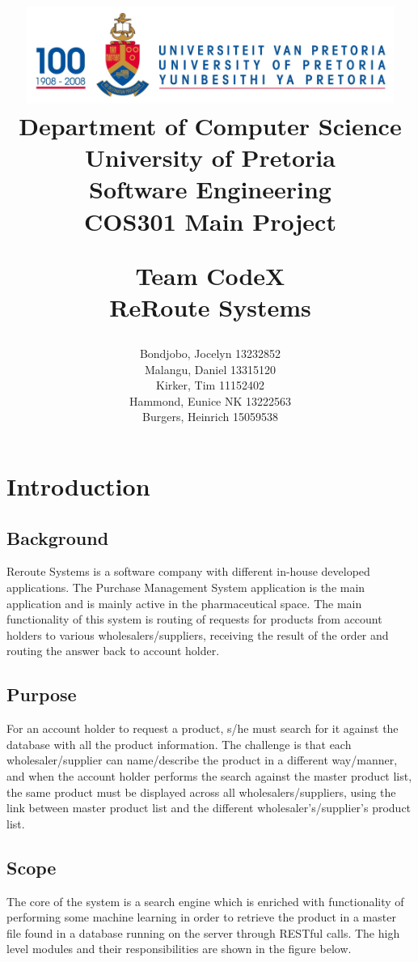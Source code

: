 \documentclass[a4paper,10pt]{article}
\title{\includegraphics[width=12cm]{Eeufeeslogo.jpg} \\
       Department of Computer Science \\
       University of Pretoria \\
       \vspace{0.5cm}
       Software Engineering\\
       COS301 Main Project \\
       \vspace{0.5cm}
       \begin{large} \textbf{Team CodeX}\\ ReRoute Systems\end{large}}
\date{}
\author{	Bondjobo, Jocelyn 		13232852 		\\
		Malangu, Daniel		13315120		\\
		Kirker, Tim			11152402		\\
		Hammond, Eunice	NK	13222563		\\
		Burgers, Heinrich		15059538		\\
}
\begin{document}
\maketitle
\thispagestyle{empty}
\clearpage

\newpage
{}
\thispagestyle{empty}
\tableofcontents
\clearpage

\newpage
{}

\section{Introduction}

	\subsection{Background} 
	Reroute Systems is a software company with different in-house developed applications. The Purchase Management System application is the main application and is mainly active in the pharmaceutical space. The main functionality of this system is routing of requests for products from account holders to various wholesalers/suppliers, receiving the result of the order and routing the answer back to account holder.
	
	\subsection{Purpose} 	
	For an account holder to request a product, s/he must search for it against the database with all the product information. The challenge is that each wholesaler/supplier can name/describe the product in a different way/manner, and when the account holder performs the search against the master product list, the same product must be displayed across all wholesalers/suppliers, using the link between master product list and the different wholesaler's/supplier's product list.
	
	\subsection{Scope} 
	The core of the system is a search engine which is enriched with functionality
of performing some machine learning in order to retrieve the product in a master file found in a database running on the server through RESTful calls. The high level modules and their responsibilities are shown in the figure below. \\ \\
\end{document}
